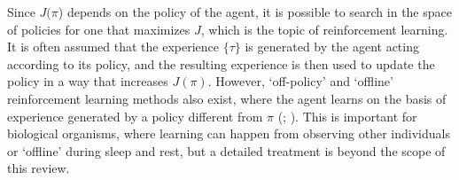 Since $J(\pi$) depends on the policy of the agent, it is possible to search in the space of policies for one that maximizes $J$, which is the topic of reinforcement learning.
It is often assumed that the experience $\{ \tau \}$ is generated by the agent acting according to its policy, and the resulting experience is then used to update the policy in a way that increases $J(\pi)$.
However, `off-policy' and `offline' reinforcement learning methods also exist, where the agent learns on the basis of experience generated by a policy different from $\pi$ (\citealp{levine2020offline}; ).
This is important for biological organisms, where learning can happen from observing other individuals or `offline' during sleep and rest, but a detailed treatment is beyond the scope of this review.


